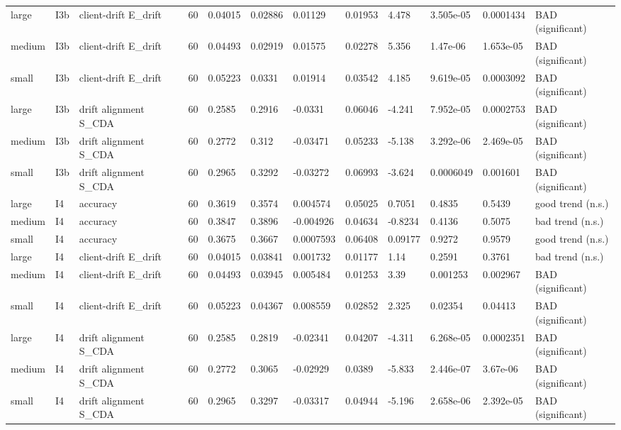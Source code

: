 \begin{table}[t]
\begin{tabular}{llllllllllll}
large & I3b & client-drift E\_drift & 60 & 0.04015 & 0.02886 & 0.01129 & 0.01953 & 4.478 & 3.505e-05 & 0.0001434 & BAD (significant) \\
medium & I3b & client-drift E\_drift & 60 & 0.04493 & 0.02919 & 0.01575 & 0.02278 & 5.356 & 1.47e-06 & 1.653e-05 & BAD (significant) \\
small & I3b & client-drift E\_drift & 60 & 0.05223 & 0.0331 & 0.01914 & 0.03542 & 4.185 & 9.619e-05 & 0.0003092 & BAD (significant) \\
large & I3b & drift alignment S\_CDA & 60 & 0.2585 & 0.2916 & -0.0331 & 0.06046 & -4.241 & 7.952e-05 & 0.0002753 & BAD (significant) \\
medium & I3b & drift alignment S\_CDA & 60 & 0.2772 & 0.312 & -0.03471 & 0.05233 & -5.138 & 3.292e-06 & 2.469e-05 & BAD (significant) \\
small & I3b & drift alignment S\_CDA & 60 & 0.2965 & 0.3292 & -0.03272 & 0.06993 & -3.624 & 0.0006049 & 0.001601 & BAD (significant) \\
large & I4 & accuracy & 60 & 0.3619 & 0.3574 & 0.004574 & 0.05025 & 0.7051 & 0.4835 & 0.5439 & good trend (n.s.) \\
medium & I4 & accuracy & 60 & 0.3847 & 0.3896 & -0.004926 & 0.04634 & -0.8234 & 0.4136 & 0.5075 & bad trend (n.s.) \\
small & I4 & accuracy & 60 & 0.3675 & 0.3667 & 0.0007593 & 0.06408 & 0.09177 & 0.9272 & 0.9579 & good trend (n.s.) \\
large & I4 & client-drift E\_drift & 60 & 0.04015 & 0.03841 & 0.001732 & 0.01177 & 1.14 & 0.2591 & 0.3761 & bad trend (n.s.) \\
medium & I4 & client-drift E\_drift & 60 & 0.04493 & 0.03945 & 0.005484 & 0.01253 & 3.39 & 0.001253 & 0.002967 & BAD (significant) \\
small & I4 & client-drift E\_drift & 60 & 0.05223 & 0.04367 & 0.008559 & 0.02852 & 2.325 & 0.02354 & 0.04413 & BAD (significant) \\
large & I4 & drift alignment S\_CDA & 60 & 0.2585 & 0.2819 & -0.02341 & 0.04207 & -4.311 & 6.268e-05 & 0.0002351 & BAD (significant) \\
medium & I4 & drift alignment S\_CDA & 60 & 0.2772 & 0.3065 & -0.02929 & 0.0389 & -5.833 & 2.446e-07 & 3.67e-06 & BAD (significant) \\
small & I4 & drift alignment S\_CDA & 60 & 0.2965 & 0.3297 & -0.03317 & 0.04944 & -5.196 & 2.658e-06 & 2.392e-05 & BAD (significant) \\
\bottomrule
\end{tabular}
\end{table}